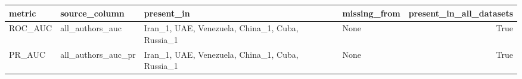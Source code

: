 \begin{tabular}{llllr}
\toprule
metric & source\_column & present\_in & missing\_from & present\_in\_all\_datasets \\
\midrule
ROC\_AUC & all\_authors\_auc & Iran\_1, UAE, Venezuela, China\_1, Cuba, Russia\_1 & None & True \\
PR\_AUC & all\_authors\_auc\_pr & Iran\_1, UAE, Venezuela, China\_1, Cuba, Russia\_1 & None & True \\
\bottomrule
\end{tabular}
